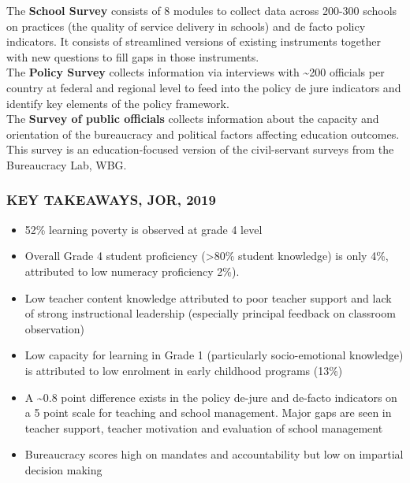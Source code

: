 \documentclass[twocolumn]{article}
\providecommand{\tightlist}{%
  \setlength{\itemsep}{0pt}\setlength{\parskip}{0pt}}
\begin{document}
The \textbf{School Survey} consists of 8 modules to collect data across
200-300 schools on practices (the quality of service delivery in
schools) and de facto policy indicators. It consists of streamlined
versions of existing instruments together with new questions to fill
gaps in those instruments.\\
The \textbf{Policy Survey} collects information via interviews with
\textasciitilde{}200 officials per country at federal and regional level
to feed into the policy de jure indicators and identify key elements of
the policy framework.\\
The \textbf{Survey of public officials} collects information about the
capacity and orientation of the bureaucracy and political factors
affecting education outcomes. This survey is an education-focused
version of the civil-servant surveys from the Bureaucracy Lab, WBG.

\hypertarget{key-takeaways-jor-2019}{%
\subsubsection{\texorpdfstring{\textbf{KEY TAKEAWAYS, JOR,
2019}}{KEY TAKEAWAYS, JOR, 2019}}\label{key-takeaways-jor-2019}}

\begin{itemize}
\tightlist
\item
  52\% learning poverty is observed at grade 4 level
\item
  Overall Grade 4 student proficiency (\textgreater{}80\% student
  knowledge) is only 4\%, attributed to low numeracy proficiency 2\%).
\item
  Low teacher content knowledge attributed to poor teacher support and
  lack of strong instructional leadership (especially principal feedback
  on classroom observation)
\item
  Low capacity for learning in Grade 1 (particularly socio-emotional
  knowledge) is attributed to low enrolment in early childhood programs
  (13\%)
\item
  A \textasciitilde{}0.8 point difference exists in the policy de-jure
  and de-facto indicators on a 5 point scale for teaching and school
  management. Major gaps are seen in teacher support, teacher motivation
  and evaluation of school management
\item
  Bureaucracy scores high on mandates and accountability but low on
  impartial decision making
\end{itemize}

\setlength\dashlinedash{0.2pt}
\setlength\dashlinegap{1.5pt}
\setlength\arrayrulewidth{0.3pt}
\end{document}
